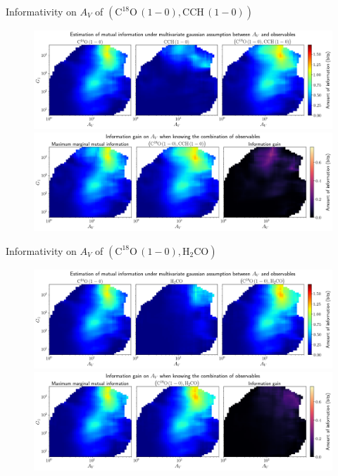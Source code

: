 \documentclass{beamer}
\begin{document}
\begin{frame}{Informativity on $A_V$ of $\left(\mathrm{C^{18}O\,(1-0)},\mathrm{CCH\,(1-0)}\right)$}
    \begin{figure}
        \centering
        \includegraphics[width=0.95\linewidth]{../linearinfo/av__c18o10_cch10_linearinfo.png}
        \vfill
        \includegraphics[width=0.95\linewidth]{../linearinfo/av__c18o10_cch10_linearinfo_gain.png}
    \end{figure}
\end{frame}

\begin{frame}{Informativity on $A_V$ of $\left(\mathrm{C^{18}O\,(1-0)},\mathrm{H_2CO}\right)$}
    \begin{figure}
        \centering
        \includegraphics[width=0.95\linewidth]{../linearinfo/av__c18o10_h2co_linearinfo.png}
        \vfill
        \includegraphics[width=0.95\linewidth]{../linearinfo/av__c18o10_h2co_linearinfo_gain.png}
    \end{figure}
\end{frame}
\end{document}
